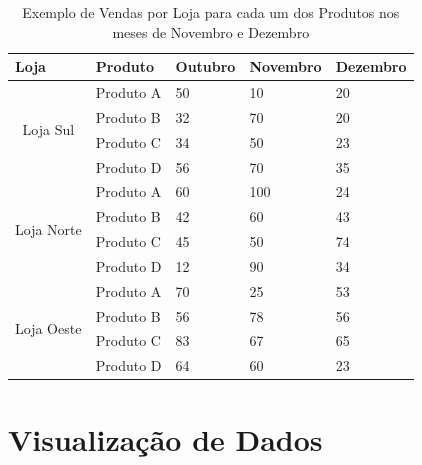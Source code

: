 \begin{table}[!ht]
\centering
\begin{tabular}{|c|l|l|l|l|}
\hline
\multicolumn{1}{|l|}{Loja}                        & Produto   & Outubro  & Novembro  & Dezembro \\ \hline
\multirow{4}{*}{Loja Sul}                         & Produto A & 50       & 10        & 20       \\ \cline{2-5} 
\multicolumn{1}{|l|}{}                            & Produto B & 32       & 70        & 20       \\ \cline{2-5} 
\multicolumn{1}{|l|}{}                            & Produto C & 34       & 50        & 23       \\ \cline{2-5} 
\multicolumn{1}{|l|}{}                            & Produto D & 56       & 70        & 35       \\ \hline
\multirow{4}{*}{Loja Norte}                       & Produto A & 60       & 100       & 24       \\ \cline{2-5} 
                                                  & Produto B & 42       & 60        & 43       \\ \cline{2-5} 
                                                  & Produto C & 45       & 50        & 74       \\ \cline{2-5} 
                                                  & Produto D & 12       & 90        & 34       \\ \hline
\multicolumn{1}{|l|}{\multirow{4}{*}{Loja Oeste}} & Produto A & 70       & 25        & 53       \\ \cline{2-5} 
\multicolumn{1}{|l|}{}                            & Produto B & 56       & 78        & 56       \\ \cline{2-5} 
\multicolumn{1}{|l|}{}                            & Produto C & 83       & 67        & 65       \\ \cline{2-5} 
\multicolumn{1}{|l|}{}                            & Produto D & 64       & 60        & 23       \\ \hline
\end{tabular}
\caption{Exemplo de Vendas por Loja para cada um dos Produtos nos meses de Novembro e Dezembro}
\label{after-pivoting}
\end{table}



\section {Visualização de Dados}

